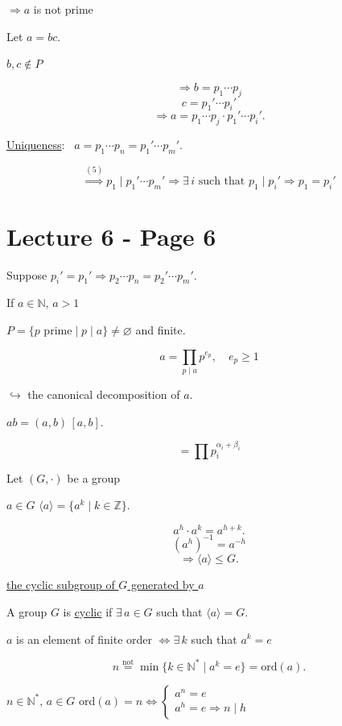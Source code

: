 \noindent $\Rightarrow a$ is not prime

\bigskip
\noindent Let $a=bc$.

\noindent $b,c\notin P$

\[
\Rightarrow b=p_1\cdots p_j
\]
\[
c=p_1'\cdots p_i'
\]
\[
\Rightarrow a = p_1\cdots p_j\cdot p_1'\cdots p_i'.
\]

\bigskip
\noindent\underline{Uniqueness}: \ $a = p_1\cdots p_n = p_1'\cdots p_m'$.

\[
\overset{(5)}{\Longrightarrow} p_1\mid p_1'\cdots p_m' \Rightarrow \exists\, i \text{ such that } p_1\mid p_i' \Rightarrow p_1=p_i'
\]



\section*{Lecture 6 - Page 6}

\noindent Suppose $p_i'=p_1' \Rightarrow p_2\cdots p_n = p_2'\cdots p_m'$.

\bigskip
\noindent If $a\in\mathbb{N}$, $a>1$

\noindent $P=\{p \text{ prime} \mid p\mid a\} \neq \varnothing$ and finite.

\[
a = \prod_{p\mid a} p^{e_p}, \quad e_p\geq 1
\]

\noindent $\hookrightarrow$ the canonical decomposition of $a$.

\bigskip
\noindent\underline{\phantom{xx}}

\noindent $ab = (a,b)\,[a,b]$.

\[
= \prod p_i^{\alpha_i+\beta_i}
\]

\bigskip
\noindent Let $(G,\cdot)$ be a group

\noindent $a\in G$ \quad $\langle a\rangle = \{a^k \mid k\in\mathbb{Z}\}$.

\[
a^h\cdot a^k = a^{h+k}.
\]
\[
(a^h)^{-1} = a^{-h}
\]
\[
\Rightarrow \langle a\rangle \leq G.
\]

\noindent\underline{the cyclic subgroup of $G$ generated by $a$}

\bigskip
\noindent A group $G$ is \underline{cyclic} if $\exists\,a\in G$ such that $\langle a\rangle = G$.

\bigskip
\noindent $a$ is an element of finite order $\Leftrightarrow \exists\,k$ such that $a^k=e$

\[
n \overset{\text{not}}{=} \min\{k\in\mathbb{N}^* \mid a^k=e\} = \text{ord}(a).
\]

\bigskip
\noindent $n\in\mathbb{N}^*$, $a\in G$ \qquad ord$(a)=n \Leftrightarrow \begin{cases}a^n=e\\ a^h=e \Rightarrow n\mid h\end{cases}$

